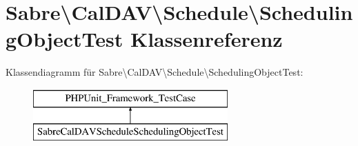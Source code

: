 \hypertarget{class_sabre_1_1_cal_d_a_v_1_1_schedule_1_1_scheduling_object_test}{}\section{Sabre\textbackslash{}Cal\+D\+AV\textbackslash{}Schedule\textbackslash{}Scheduling\+Object\+Test Klassenreferenz}
\label{class_sabre_1_1_cal_d_a_v_1_1_schedule_1_1_scheduling_object_test}
Klassendiagramm für Sabre\textbackslash{}Cal\+D\+AV\textbackslash{}Schedule\textbackslash{}Scheduling\+Object\+Test\+:\begin{figure}[H]
\begin{center}
\leavevmode
\includegraphics[height=2.000000cm]{class_sabre_1_1_cal_d_a_v_1_1_schedule_1_1_scheduling_object_test}
\end{center}
\end{figure}
